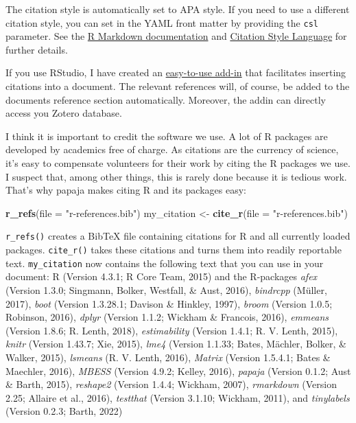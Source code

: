 \documentclass[
  man,floatsintext]{apa6}
\newenvironment{Shaded}{\begin{snugshade}}{\end{snugshade}}
\newcommand{\AttributeTok}[1]{\textcolor[rgb]{0.13,0.29,0.53}{#1}}
\newcommand{\FunctionTok}[1]{\textcolor[rgb]{0.13,0.29,0.53}{\textbf{#1}}}
\newcommand{\NormalTok}[1]{#1}
\newcommand{\OtherTok}[1]{\textcolor[rgb]{0.56,0.35,0.01}{#1}}
\newcommand{\StringTok}[1]{\textcolor[rgb]{0.31,0.60,0.02}{#1}}
\begin{document}
The citation style is automatically set to APA style.
If you need to use a different citation style, you can set in the YAML front matter by providing the \texttt{csl} parameter.
See the \href{https://rmarkdown.rstudio.com/authoring_bibliographies_and_citations.html}{R Markdown documentation} and \href{http://citationstyles.org/}{Citation Style Language} for further details.

If you use RStudio, I have created an \href{https://github.com/crsh/citr}{easy-to-use add-in} that facilitates inserting citations into a document.
The relevant references will, of course, be added to the documents reference section automatically.
Moreover, the addin can directly access you Zotero database.

I think it is important to credit the software we use.
A lot of R packages are developed by academics free of charge.
As citations are the currency of science, it's easy to compensate volunteers for their work by citing the R packages we use.
I suspect that, among other things, this is rarely done because it is tedious work.
That's why papaja makes citing R and its packages easy:

\begin{Shaded}
\begin{Highlighting}[]
\FunctionTok{r\_refs}\NormalTok{(}\AttributeTok{file =} \StringTok{"r{-}references.bib"}\NormalTok{)}
\NormalTok{my\_citation }\OtherTok{\textless{}{-}} \FunctionTok{cite\_r}\NormalTok{(}\AttributeTok{file =} \StringTok{"r{-}references.bib"}\NormalTok{)}
\end{Highlighting}
\end{Shaded}

\texttt{r\_refs()} creates a BibTeX file containing citations for R and all currently loaded packages.
\texttt{cite\_r()} takes these citations and turns them into readily reportable text.
\texttt{my\_citation} now contains the following text that you can use in your document: R (Version 4.3.1; R Core Team, 2015) and the R-packages \emph{afex} (Version 1.3.0; Singmann, Bolker, Westfall, \& Aust, 2016), \emph{bindrcpp} (Müller, 2017), \emph{boot} (Version 1.3.28.1; Davison \& Hinkley, 1997), \emph{broom} (Version 1.0.5; Robinson, 2016), \emph{dplyr} (Version 1.1.2; Wickham \& Francois, 2016), \emph{emmeans} (Version 1.8.6; R. Lenth, 2018), \emph{estimability} (Version 1.4.1; R. V. Lenth, 2015), \emph{knitr} (Version 1.43.7; Xie, 2015), \emph{lme4} (Version 1.1.33; Bates, Mächler, Bolker, \& Walker, 2015), \emph{lsmeans} (R. V. Lenth, 2016), \emph{Matrix} (Version 1.5.4.1; Bates \& Maechler, 2016), \emph{MBESS} (Version 4.9.2; Kelley, 2016), \emph{papaja} (Version 0.1.2; Aust \& Barth, 2015), \emph{reshape2} (Version 1.4.4; Wickham, 2007), \emph{rmarkdown} (Version 2.25; Allaire et al., 2016), \emph{testthat} (Version 3.1.10; Wickham, 2011), and \emph{tinylabels} (Version 0.2.3; Barth, 2022)
\end{document}
